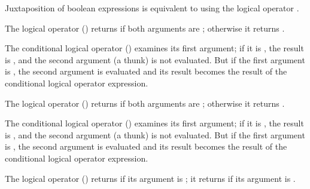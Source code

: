 
Juxtaposition of boolean expressions is equivalent to using the logical
 operator \EXP{\wedge}.



The logical  operator \EXP{\wedge} () returns  if both arguments are ;
otherwise it returns .

The conditional logical  operator \EXP{\wedge\COLONOP} () examines its first argument;
if it is , the result is , and the second argument (a thunk) is not evaluated.
But if the first argument is , the second argument is evaluated and its result becomes
the result of the conditional logical  operator expression.



The logical  operator \EXP{\vee} () returns  if both arguments are ;
otherwise it returns .

The conditional logical  operator \EXP{\vee\COLONOP} () examines its first argument;
if it is , the result is , and the second argument (a thunk) is not evaluated.
But if the first argument is , the second argument is evaluated and its result becomes
the result of the conditional logical  operator expression.



The logical  operator \EXP{\neg} () returns  if its argument is ;
it returns  if its argument is .



